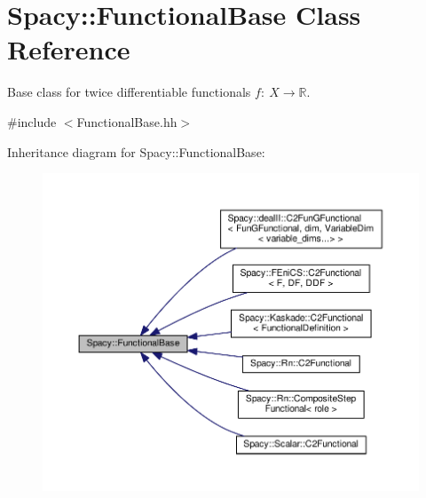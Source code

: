 \hypertarget{classSpacy_1_1FunctionalBase}{\section{Spacy\-:\-:Functional\-Base Class Reference}
\label{classSpacy_1_1FunctionalBase}
}


Base class for twice differentiable functionals $ f:\ X\rightarrow \mathbb{R}$.  




{\ttfamily \#include $<$Functional\-Base.\-hh$>$}



Inheritance diagram for Spacy\-:\-:Functional\-Base\-:
\nopagebreak
\begin{figure}[H]
\begin{center}
\leavevmode
\includegraphics[width=350pt]{classSpacy_1_1FunctionalBase__inherit__graph}
\end{center}
\end{figure}
